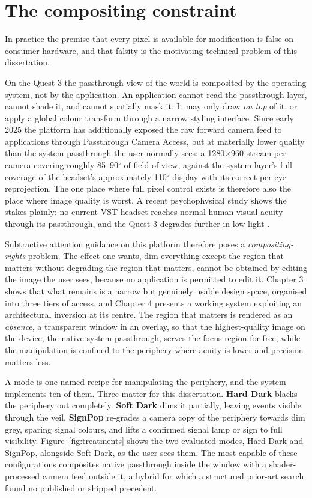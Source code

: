 \section{The compositing constraint}

In practice the premise that every pixel is available for modification is false on consumer hardware,
and that falsity is the motivating technical problem of this dissertation.

On the Quest 3 the passthrough view of the world is composited by the operating system, not by the
application. An application cannot read the passthrough layer, cannot shade it, and cannot spatially
mask it. It may only draw \textit{on top} of it, or apply a global colour transform through a narrow
styling interface. Since early 2025 the platform has additionally exposed the raw forward camera feed
to applications through Passthrough Camera Access, but at materially lower quality than the system
passthrough the user normally sees: a 1280$\times$960 stream per camera covering roughly
85--90$^{\circ}$ of field of view, against the system layer's full coverage of the headset's
approximately 110$^{\circ}$ display with its correct per-eye reprojection. The one place where full
pixel control exists is therefore also the place where image quality is worst. A recent
psychophysical study shows the stakes plainly: no current VST headset reaches normal human visual
acuity through its passthrough, and the Quest 3 degrades further in low light \citep{wang2026}.

Subtractive attention guidance on this platform therefore poses a \textit{compositing-rights}
problem. The effect one wants, dim everything except the region that matters without degrading the
region that matters, cannot be obtained by editing the image the user sees, because no application is
permitted to edit it. Chapter 3 shows that what remains is a narrow but genuinely usable design
space, organised into three tiers of access, and Chapter 4 presents a working system exploiting an
architectural inversion at its centre. The region that matters is rendered as an \textit{absence}, a
transparent window in an overlay, so that the highest-quality image on the device, the native system
passthrough, serves the focus region for free, while the manipulation is confined to the periphery
where acuity is lower and precision matters less.

A mode is one named recipe for manipulating the periphery, and
the system implements ten of them. Three matter for this dissertation. \textbf{Hard Dark} blacks the
periphery out completely. \textbf{Soft Dark} dims it partially, leaving events visible through the
veil. \textbf{SignPop} re-grades a camera copy of the periphery towards dim grey, sparing signal
colours, and lifts a confirmed signal lamp or sign to full visibility. Figure~\ref{fig:treatments} shows the
two evaluated modes, Hard Dark and SignPop, alongside Soft Dark, as the user sees them. The most
capable of these configurations composites native passthrough inside the window with a
shader-processed camera feed outside it, a hybrid for which a structured prior-art search found no
published or shipped precedent.

